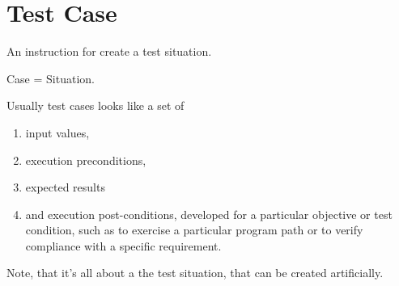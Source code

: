 \section{Test Case}
\label{sec:Test Case}

An instruction for create a test situation.

\begin{center}
Case = Situation.
\end{center}

Usually test cases looks like a set of

\begin{enumerate}
\item 
    input values,
\item     execution preconditions,
\item     expected results
\item     and execution post-conditions, developed for a particular objective or test condition, such as to exercise a particular program path or to verify compliance with a specific requirement.
\end{enumerate}

Note, that it's all about a the test situation, that can be created artificially.
